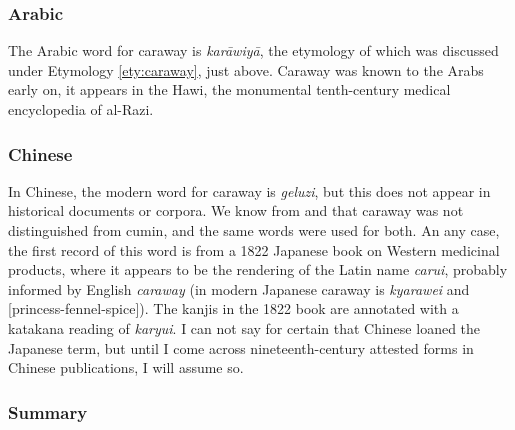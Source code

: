 

\subsubsection{Arabic}

% 

The Arabic word for caraway is  \textit{karāwiyā}, the etymology of which was discussed under Etymology \ref{ety:caraway}, just above. Caraway was known to the Arabs early on, it appears in the \gls{Hawi}, the monumental tenth-century medical encyclopedia of al-Razi.



\subsubsection{Chinese}



In Chinese, the modern word for caraway is  \textit{geluzi}, but this does not appear in historical documents or corpora. We know from \textcite{laufer_sino-iranica_1919} and \textcite{schafer_golden_1985} that caraway was not distinguished from cumin, and the same words were used for both. An any case, the first record of this word is from a 1822 Japanese book on Western medicinal products, where it appears to be the rendering of the Latin name \textit{carui}, probably informed by English \textit{caraway} (in modern Japanese caraway is  \textit{kyarawei} and  [princess-fennel-spice]). The kanjis in the 1822 book are annotated with a katakana reading of  \textit{karyui}. I can not say for certain that Chinese loaned the Japanese term, but until I come across nineteenth-century attested forms in Chinese publications, I will assume so.



\subsubsection{Summary}



